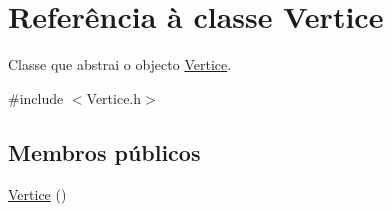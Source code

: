 \hypertarget{class_vertice}{\section{Referência à classe Vertice}
\label{class_vertice}
}


Classe que abstrai o objecto \hyperlink{class_vertice}{Vertice}.  




{\ttfamily \#include $<$Vertice.\-h$>$}

\subsection*{Membros públicos}
\begin{DoxyCompactItemize}
\item 
\hypertarget{class_vertice_a9dd7cf987cddf248b9d4e3d31bf8822b}{\hyperlink{class_vertice_a9dd7cf987cddf248b9d4e3d31bf8822b}{Vertice} ()}\label{class_vertice_a9dd7cf987cddf248b9d4e3d31bf8822b}


\end{DoxyCompactItemize}
